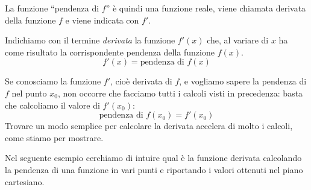 La funzione ``pendenza di \(f\)'' è quindi una funzione reale, 
viene chiamata derivata della funzione \(f\) 
e viene indicata con \(f'\).


\begin{definizione}
Indichiamo con il termine \emph{derivata} la funzione \(f'(x)\) che, al 
variare di \(x\) ha come risultato la corrispondente pendenza della 
funzione \(f(x)\).
\[f'(x) = \text{pendenza di } f(x)\]
\end{definizione}


Se conosciamo la funzione \(f'\), cioè derivata di \(f\), e vogliamo sapere 
la pendenza di \(f\) nel punto \(x_0\), non occorre che facciamo 
tutti i calcoli visti in precedenza: basta che calcoliamo il valore di 
 \(f'(x_0)\): 
\[\text{pendenza di } f(x_0) = f'(x_0)\]
Trovare un modo semplice per calcolare la derivata accelera di 
molto i calcoli, come stiamo per mostrare.

Nel seguente esempio cerchiamo di intuire qual è la funzione derivata 
calcolando la pendenza di una funzione in vari punti 
e riportando i valori ottenuti nel piano cartesiano.

\pagebreak %


